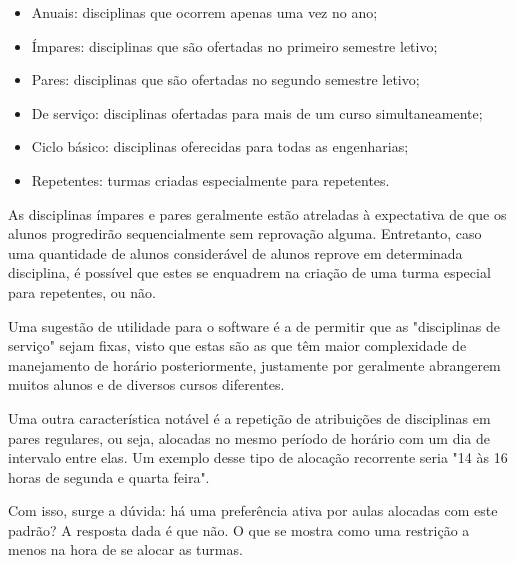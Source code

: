         \begin{itemize}
            \item Anuais: disciplinas que ocorrem apenas uma vez no ano;
            \item Ímpares: disciplinas que são ofertadas no primeiro semestre letivo;
            \item Pares: disciplinas que são ofertadas no segundo semestre letivo;
            \item De serviço: disciplinas ofertadas para mais de um curso simultaneamente;
            \item Ciclo básico: disciplinas oferecidas para todas as engenharias;
            \item Repetentes: turmas criadas especialmente para repetentes.
        \end{itemize}


        As disciplinas ímpares e pares geralmente estão atreladas à expectativa de que os alunos progredirão sequencialmente sem reprovação alguma. Entretanto, caso uma quantidade de alunos considerável de alunos reprove em determinada disciplina, é possível que estes se enquadrem na criação de uma turma especial para repetentes, ou não.

        Uma sugestão de utilidade para o software é a de permitir que as "disciplinas de serviço" sejam fixas, visto que estas são as que têm maior complexidade de manejamento de horário posteriormente, justamente por geralmente abrangerem muitos alunos e de diversos cursos diferentes.

        Uma outra característica notável é a repetição de atribuições de disciplinas em pares regulares, ou seja, alocadas no mesmo período de horário com um dia de intervalo entre elas. Um exemplo desse tipo de alocação recorrente seria "14 às 16 horas de segunda e quarta feira".

        Com isso, surge a dúvida: há uma preferência ativa por aulas alocadas com este padrão? A resposta dada é que não. O que se mostra como uma restrição a menos na hora de se alocar as turmas.

